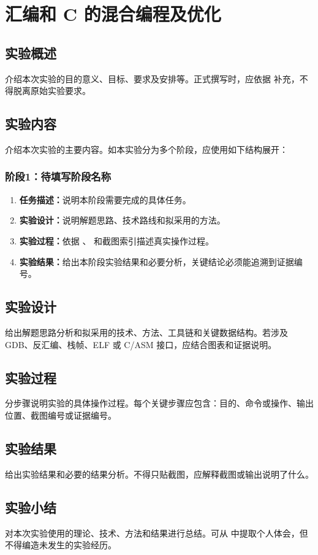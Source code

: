 \section{汇编和 C 的混合编程及优化}

\subsection{实验概述}

介绍本次实验的目的意义、目标、要求及安排等。正式撰写时，应依据  补充，不得脱离原始实验要求。

\subsection{实验内容}

介绍本次实验的主要内容。如本实验分为多个阶段，应使用如下结构展开：

\subsubsection{阶段1：待填写阶段名称}

\begin{enumerate}[label=\arabic*.]
    \item \textbf{任务描述：}说明本阶段需要完成的具体任务。
    \item \textbf{实验设计：}说明解题思路、技术路线和拟采用的方法。
    \item \textbf{实验过程：}依据 、 和截图索引描述真实操作过程。
    \item \textbf{实验结果：}给出本阶段实验结果和必要分析，关键结论必须能追溯到证据编号。
\end{enumerate}

\subsection{实验设计}

给出解题思路分析和拟采用的技术、方法、工具链和关键数据结构。若涉及 GDB、反汇编、栈帧、ELF 或 C/ASM 接口，应结合图表和证据说明。

\subsection{实验过程}

分步骤说明实验的具体操作过程。每个关键步骤应包含：目的、命令或操作、输出位置、截图编号或证据编号。

\subsection{实验结果}

给出实验结果和必要的结果分析。不得只贴截图，应解释截图或输出说明了什么。

\subsection{实验小结}

对本次实验使用的理论、技术、方法和结果进行总结。可从  中提取个人体会，但不得编造未发生的实验经历。
